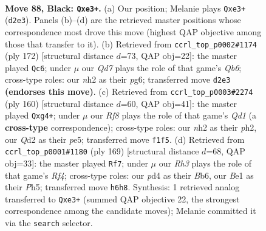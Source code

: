 \documentclass[11pt]{article}
\begin{document}
\clearpage

\begin{figure}[p]\centering
\begin{subfigure}{0.46\textwidth}\centering
\resizebox{\linewidth}{!}{%
\newchessgame
\chessboard[
  setfen={4k3/p5Q1/7r/7P/3P4/4P2K/3q3N/4br2 b - - 4 88},
  showmover=false,
  pgfstyle=straightmove, color=movearrow, markmove={d2-e3}
]}
\caption{}
\end{subfigure}\hfill
\begin{subfigure}{0.46\textwidth}\centering
\resizebox{\linewidth}{!}{%
\newchessgame
\chessboard[
  setfen={1r6/1P2q1k1/1Q4p1/1R3p2/8/1K1P4/8/8 w - - 22 87},
  showmover=false,
  pgfstyle=straightmove, color=movearrow, markmove={b6-c6}
]}
\caption{}
\end{subfigure}
\\[4pt]
\begin{subfigure}{0.46\textwidth}\centering
\resizebox{\linewidth}{!}{%
\newchessgame
\chessboard[
  setfen={2q5/3R1pk1/8/4p3/p5p1/8/P6p/K2Q4 w - - 0 81},
  showmover=false,
  pgfstyle=straightmove, color=movearrow, markmove={d1-g4}
]}
\caption{}
\end{subfigure}\hfill
\begin{subfigure}{0.46\textwidth}\centering
\resizebox{\linewidth}{!}{%
\newchessgame
\chessboard[
  setfen={8/4k2Q/1b1r4/5r1p/P4P2/5BK1/8/8 b - - 7 85},
  showmover=false,
  pgfstyle=straightmove, color=movearrow, markmove={f5-f7}
]}
\caption{}
\end{subfigure}
\caption{\textbf{Move 88, Black: \texttt{Qxe3+}.} (a) Our position; Melanie plays \texttt{Qxe3+} (\texttt{d2e3}). Panels (b)--(d) are the retrieved master positions whose correspondence most drove this move (highest QAP objective among those that transfer to it). (b) Retrieved from \texttt{ccrl\_top\_p0002\#1174} (ply 172) [structural distance $d$=73, QAP obj=22]: the master played \texttt{Qc6}; under $\mu$ our \emph{Qd7} plays the role of that game's \emph{Qb6}; cross-type roles: our \emph{n}h2 as their \emph{p}g6; transferred move \texttt{d2e3} \textbf{(endorses this move)}. (c) Retrieved from \texttt{ccrl\_top\_p0003\#2274} (ply 160) [structural distance $d$=60, QAP obj=41]: the master played \texttt{Qxg4+}; under $\mu$ our \emph{Rf8} plays the role of that game's \emph{Qd1} (a \textbf{cross-type} correspondence); cross-type roles: our \emph{n}h2 as their \emph{p}h2, our \emph{Q}d2 as their \emph{p}e5; transferred move \texttt{f1f5}. (d) Retrieved from \texttt{ccrl\_top\_p0001\#1180} (ply 169) [structural distance $d$=68, QAP obj=33]: the master played \texttt{Rf7}; under $\mu$ our \emph{Rh3} plays the role of that game's \emph{Rf4}; cross-type roles: our \emph{p}d4 as their \emph{B}b6, our \emph{B}e1 as their \emph{P}h5; transferred move \texttt{h6h8}. Synthesis: 1 retrieved analog transferred to \texttt{Qxe3+} (summed QAP objective 22, the strongest correspondence among the candidate moves); Melanie committed it via the \texttt{search} selector.}
\label{fig:thought-m175}
\end{figure}
\end{document}
